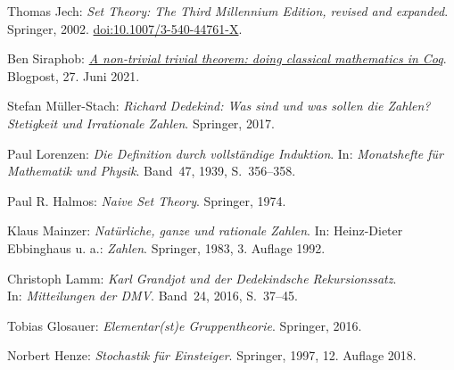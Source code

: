 \begin{thebibliography}{00}
 Thomas Jech: \emph{Set Theory: The Third Millennium
Edition, revised and expanded}. Springer, 2002.
\href{https://doi.org/10.1007/3-540-44761-X}{doi:10.1007/3-540-44761-X}.

 Ben Siraphob:
\href{https://siraben.dev/2021/06/27/classical-math-coq.html}{%
\emph{A non-trivial trivial theorem: doing classical mathematics in Coq}}.
Blogpost, 27. Juni 2021.

 Stefan Müller-Stach:
\emph{Richard Dedekind: Was sind und was sollen die Zahlen?
Stetigkeit und Irrationale Zahlen}. Springer, 2017.

 Paul Lorenzen:
\emph{Die Definition durch vollständige Induktion}.
In: \emph{Monatshefte für Mathematik und Physik}.
Band~47, 1939, S.~356--358.

 Paul R. Halmos:
\emph{Naive Set Theory}. Springer, 1974.

 Klaus Mainzer:
\emph{Natürliche, ganze und rationale Zahlen}.
In: Heinz-Dieter Ebbinghaus u. a.: \emph{Zahlen}.
Springer, 1983, 3. Auflage 1992.

 Christoph Lamm:
\emph{Karl Grandjot und der Dedekindsche Rekursionssatz}.\\
In: \emph{Mitteilungen der DMV}. Band~24, 2016, S.~37--45.

 Tobias Glosauer:
\emph{Elementar(st)e Gruppentheorie}.
Springer, 2016.

 Norbert Henze: \emph{Stochastik für Einsteiger}.
Springer, 1997, 12. Auflage 2018.
\end{thebibliography}
